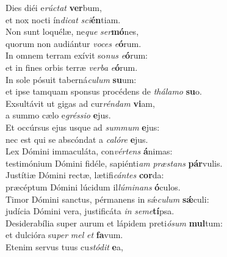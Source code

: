 \evenverse Dies diéi e\textit{rú}\textit{ctat} \textbf{ver}bum,~\*\\
\evenverse et nox nocti ín\textit{di}\textit{cat} \textit{sci}\textbf{én}tiam.\\
\oddverse Non sunt loquélæ, ne\textit{que} \textit{ser}\textbf{mó}nes,~\*\\
\oddverse quorum non audiántur \textit{vo}\textit{ces} \textit{e}\textbf{ó}rum.\\
\evenverse In omnem terram exívit so\textit{nus} \textit{e}\textbf{ó}rum:~\*\\
\evenverse et in fines orbis terræ \textit{ver}\textit{ba} \textit{e}\textbf{ó}rum.\\
\oddverse In sole pósuit taberná\textit{cu}\textit{lum} \textbf{su}um:~\*\\
\oddverse et ipse tamquam sponsus procédens de \textit{thá}\textit{la}\textit{mo} \textbf{su}o.\\
\evenverse Exsultávit ut gigas ad cur\textit{rén}\textit{dam} \textbf{vi}am,~\*\\
\evenverse a summo cælo e\textit{grés}\textit{si}\textit{o} \textbf{e}jus.\\
\oddverse Et occúrsus ejus usque ad \textit{sum}\textit{mum} \textbf{e}jus:~\*\\
\oddverse nec est qui se abscóndat a \textit{ca}\textit{ló}\textit{re} \textbf{e}jus.\\
\evenverse Lex Dómini immaculáta, con\textit{vér}\textit{tens} \textbf{á}nimas:~\*\\
\evenverse testimónium Dómini fidéle, sapiénti\textit{am} \textit{præ}\textit{stans} \textbf{pár}vulis.\\
\oddverse Justítiæ Dómini rectæ, lætifi\textit{cán}\textit{tes} \textbf{cor}da:~\*\\
\oddverse præcéptum Dómini lúcidum il\textit{lú}\textit{mi}\textit{nans} \textbf{ó}culos.\\
\evenverse Timor Dómini sanctus, pérmanens in sǽ\textit{cu}\textit{lum} \textbf{sǽ}culi:~\*\\
\evenverse judícia Dómini vera, justificáta \textit{in} \textit{se}\textit{me}\textbf{tí}psa.\\
\oddverse Desiderabília super aurum et lápidem preti\textit{ó}\textit{sum} \textbf{mul}tum:~\*\\
\oddverse et dulcióra su\textit{per} \textit{mel} \textit{et} \textbf{fa}vum.\\
\evenverse Etenim servus tuus cu\textit{stó}\textit{dit} \textbf{e}a,~\*\\

